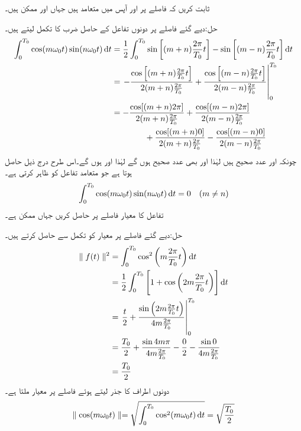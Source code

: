 ثابت کریں کہ  فاصلے پر  اور  آپس میں متعامد ہیں جہاں  اور  ممکن ہیں۔

حل:دیے گئے فاصلے پر دونوں تفاعل کے حاصل ضرب کا تکمل لیتے ہیں۔
\begin{align*}
\int_0^{T_0} \cos (m\omega_0 t) \sin (n\omega_0 t) \dif t&=\frac{1}{2}\int_0^{T_0} \sin\left[(m+n)\frac{2\pi}{T_0} t\right]-\sin\left[(m-n)\frac{2\pi}{T_0} t\right]\dif t\\
&=\left.-\frac{\cos\left[(m+n)\frac{2\pi}{T_0} t\right]}{2(m+n)\frac{2\pi}{T_0}}+\frac{\cos\left[(m-n)\frac{2\pi}{T_0} t\right]}{2(m-n)\frac{2\pi}{T_0}}\right|_0^{T_0}\\
&=-\frac{\cos[(m+n)2\pi]}{2(m+n)\frac{2\pi}{T_0}}+\frac{\cos[(m-n)2\pi]}{2(m-n)\frac{2\pi}{T_0}}\\
&\quad \quad \quad \quad +\frac{\cos[(m+n)0]}{2(m+n)\frac{2\pi}{T_0}}-\frac{\cos[(m-n)0]}{2(m-n)\frac{2\pi}{T_0}}
\end{align*}
چونکہ  اور  عدد صحیح ہیں لہٰذا  اور  بھی عدد صحیح ہوں گے لہٰذا  اور   ہوں گے۔اس طرح درج ذیل حاصل ہوتا ہے جو متعامد تفاعل کو ظاہر کرتی ہے۔
\begin{align}\label{مساوات_فوریئر_مختلف_تکمل_پ}
\int_0^{T_0} \cos (m\omega_0 t) \sin (n\omega_0 t) \dif t=0\quad (m\ne n)
\end{align}
تفاعل  کا معیار  فاصلے پر حاصل کریں جہاں   ممکن ہے۔ 

حل:دیے گئے فاصلے پر معیار کو تکمل سے حاصل کرتے ہیں۔
\begin{align*}
\parallel f(t) \parallel^2&=\int_0^{T_0} \cos^2 \left(m\frac{2\pi}{T_0} t\right) \dif t\\
&=\frac{1}{2}\int_0^{T_0}\left[ 1+\cos \left(2m\frac{2\pi}{T_0} t\right)\right] \dif t\\
&=\left. \frac{t}{2}+\frac{\sin \left(2m\frac{2\pi}{T_0} t\right)}{4m\frac{2\pi}{T_0}}\right|_0^{T_0}\\
&=\frac{T_0}{2}+\frac{\sin 4m\pi}{4m\frac{2\pi}{T_0}}-\frac{0}{2}-\frac{\sin 0}{4m\frac{2\pi}{T_0}}\\
&=\frac{T_0}{2}
\end{align*}
دونوں اطراف کا جذر لیتے ہوئے   فاصلے پر معیار ملتا ہے۔
\begin{align}\label{مساوات_فوریئر_مختلف_تکمل_ت}
\parallel \cos (m\omega_0 t) \parallel =\sqrt{\int_0^{T_0} \cos^2  (m\omega_0 t) \dif t}=\sqrt{\frac{T_0}{2}}
\end{align}

